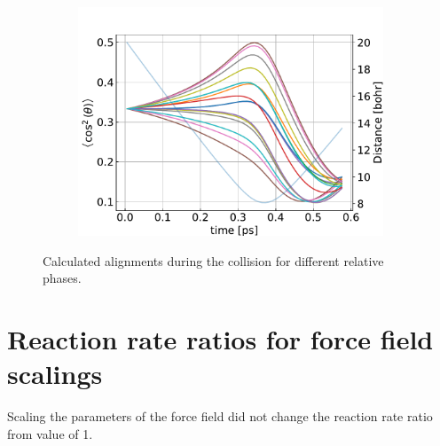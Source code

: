 \documentclass{article}
\begin{document}
    \begin{figure}[H]
        \centering
        \begin{subfigure}{.7\linewidth}
            \centering
            \includegraphics[width=\linewidth]{alignments_coriolis_phases.pdf}
        \end{subfigure} 
        \caption{Calculated alignments during the collision for different relative phases.}
    \end{figure}

    \section{Reaction rate ratios for force field scalings}
        Scaling the parameters of the force field did not change the reaction rate ratio
        from value of 1.
\end{document}
